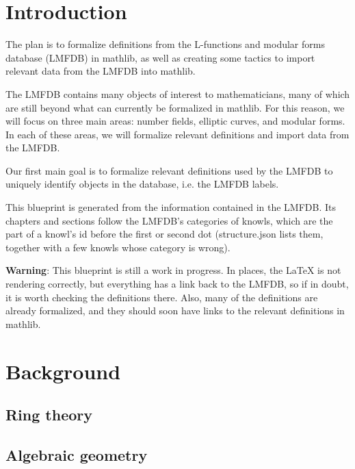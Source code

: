
\tableofcontents

\chapter{Introduction}

The plan is to formalize definitions from the L-functions and modular forms database (LMFDB) in mathlib, as well as creating some tactics to import relevant data from the LMFDB into mathlib.

The LMFDB contains many objects of interest to mathematicians, many of which are still beyond what can currently be formalized in mathlib. For this reason, we will focus on three main areas: number fields, elliptic curves, and modular forms. In each of these areas, we will formalize relevant definitions and import data from the LMFDB.

Our first main goal is to formalize relevant definitions used by the LMFDB to uniquely identify objects in the database, i.e. the LMFDB labels.

This blueprint is generated from the information contained in the LMFDB. Its chapters and sections follow the LMFDB's categories of knowls, which are the part of a knowl's id before the first or second dot (structure.json lists them, together with a few knowls whose category is wrong).

\textbf{Warning}: This blueprint is still a work in progress. In places, the LaTeX is not rendering correctly, but everything has a link back to the LMFDB, so if in doubt, it is worth checking the definitions there. Also, many of the definitions are already formalized, and they should soon have links to the relevant definitions in mathlib.

\chapter{Background}

\section{Ring theory}


\section{Algebraic geometry}


